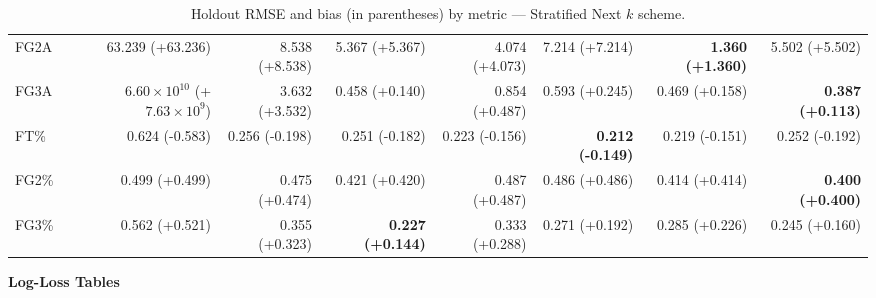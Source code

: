 \documentclass{article}
\begin{document}
\begin{table}[H]
{\begin{tabular}{lrrrrrrr}
FG2A & 63.239 (+63.236) & 8.538 (+8.538) & 5.367 (+5.367) & 4.074 (+4.073) & 7.214 (+7.214) & \textbf{1.360 (+1.360)} & 5.502 (+5.502) \\
FG3A & $6.60\times10^{10}$ (+$7.63\times10^{9}$) & 3.632 (+3.532) & 0.458 (+0.140) & 0.854 (+0.487) & 0.593 (+0.245) & 0.469 (+0.158) & \textbf{0.387 (+0.113)} \\
FT\% & 0.624 (-0.583) & 0.256 (-0.198) & 0.251 (-0.182) & 0.223 (-0.156) & \textbf{0.212 (-0.149)} & 0.219 (-0.151) & 0.252 (-0.192) \\
FG2\% & 0.499 (+0.499) & 0.475 (+0.474) & 0.421 (+0.420) & 0.487 (+0.487) & 0.486 (+0.486) & 0.414 (+0.414) & \textbf{0.400 (+0.400)} \\
FG3\% & 0.562 (+0.521) & 0.355 (+0.323) & \textbf{0.227 (+0.144)} & 0.333 (+0.288) & 0.271 (+0.192) & 0.285 (+0.226) & 0.245 (+0.160) \\
\bottomrule
\end{tabular}
}
\caption{Holdout RMSE and bias (in parentheses) by metric — Stratified Next $k$ scheme.}
\label{tab:coverage_stratified_next_k}
\end{table}

\bigskip
{\centering\large\textbf{Log-Loss Tables}\\[4pt]}
\end{document}
